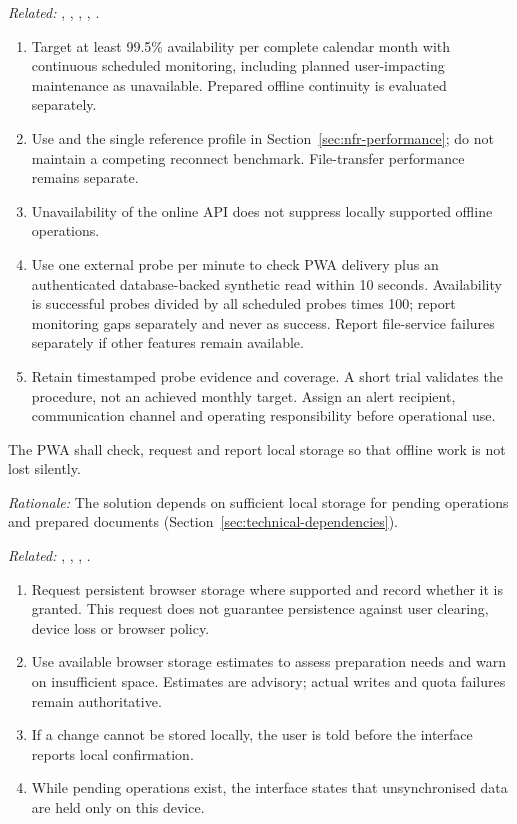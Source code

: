 \textit{Related:} \hyperref[fr:004]{}, \hyperref[fr:029]{}, \hyperref[fr:034]{}, \hyperref[fr:037]{}, \hyperref[fr:048]{}.
\begin{enumerate}[label=(\alph*),leftmargin=*,itemsep=1pt,topsep=3pt]
\item Target at least 99.5\% availability per complete calendar month with continuous scheduled monitoring, including planned user-impacting maintenance as unavailable. Prepared offline continuity is evaluated separately.
\item Use \hyperref[nfr:PERF-08]{} and the single reference profile in Section~\ref{sec:nfr-performance}; do not maintain a competing reconnect benchmark. File-transfer performance remains separate.
\item Unavailability of the online API does not suppress locally supported offline operations.
\item Use one external probe per minute to check PWA delivery plus an authenticated database-backed synthetic read within 10 seconds. Availability is successful probes divided by all scheduled probes times 100; report monitoring gaps separately and never as success. Report file-service failures separately if other features remain available.
\item Retain timestamped probe evidence and coverage. A short trial validates the procedure, not an achieved monthly target. Assign an alert recipient, communication channel and operating responsibility before operational use.
\end{enumerate}

\label{nfr:AOC-05}
The PWA shall check, request and report local storage so that offline work is not lost silently.

\textit{Rationale:} The solution depends on sufficient local storage for pending operations and prepared documents (Section~\ref{sec:technical-dependencies}).

\textit{Related:} \hyperref[fr:004]{}, \hyperref[fr:028]{}, \hyperref[fr:034]{}, \hyperref[fr:039]{}.
\begin{enumerate}[label=(\alph*),leftmargin=*,itemsep=1pt,topsep=3pt]
\item Request persistent browser storage where supported and record whether it is granted. This request does not guarantee persistence against user clearing, device loss or browser policy.
\item Use available browser storage estimates to assess preparation needs and warn on insufficient space. Estimates are advisory; actual writes and quota failures remain authoritative.
\item If a change cannot be stored locally, the user is told before the interface reports local confirmation.
\item While pending operations exist, the interface states that unsynchronised data are held only on this device.
\end{enumerate}

